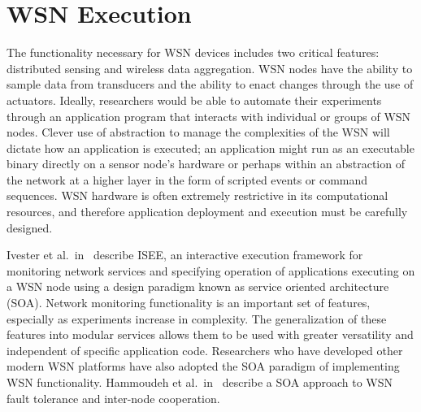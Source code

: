 \section{WSN Execution}
The functionality necessary for WSN devices includes two critical features: distributed sensing and wireless data aggregation. WSN nodes have the ability to sample data from transducers and the ability to enact changes through the use of actuators. Ideally, researchers would be able to automate their experiments through an application program that interacts with individual or groups of WSN nodes. Clever use of abstraction to manage the complexities of the WSN will dictate how an application is executed; an application might run as an executable binary directly on a sensor node's hardware or perhaps within an abstraction of the network at a higher layer in the form of scripted events or command sequences. WSN hardware is often extremely restrictive in its computational resources, and therefore application deployment and execution must be carefully designed.

Ivester et al.\ in~\cite{Ivester} describe ISEE, an interactive execution framework for monitoring network services and specifying operation of applications executing on a WSN node using a design paradigm known as service oriented architecture (SOA). Network monitoring functionality is an important set of features, especially as experiments increase in complexity. The generalization of these features into modular services allows them to be used with greater versatility and independent of specific application code. Researchers who have developed other modern WSN platforms have also adopted the SOA paradigm of implementing WSN functionality. Hammoudeh et al.\ in~\cite{Hammoudeh} describe a SOA approach to WSN fault tolerance and inter-node cooperation.

